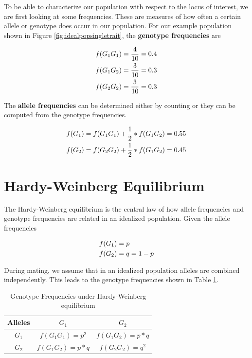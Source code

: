 \documentclass[]{book}
\theoremstyle{definition}
\theoremstyle{definition}
\theoremstyle{definition}
\theoremstyle{remark}
\begin{document}
To be able to characterize our population with respect to the locus of interest, we are first looking at some frequencies. These are measures of how often a certain allele or genotype does occur in our population. For our example population shown in Figure \ref{fig:idealpopsingletrait}, the \textbf{genotype frequencies} are

\begin{align}
f(G_1G_1) &= \frac{4}{10} = 0.4 \notag \\
f(G_1G_2) &= \frac{3}{10} = 0.3 \notag \\
f(G_2G_2) &= \frac{3}{10} = 0.3  \label{eq:genotypefreq}
\end{align}

The \textbf{allele frequencies} can be determined either by counting or they can be computed from the genotype frequencies.

\begin{align}
f(G_1) &= f(G_1G_1) + {1\over 2}*f(G_1G_2) = 0.55 \notag \\
f(G_2) &= f(G_2G_2) + {1\over 2}*f(G_1G_2) = 0.45 \label{eq:allelefreq}
\end{align}

\hypertarget{hw-eq}{%
\section{Hardy-Weinberg Equilibrium}\label{hw-eq}}

The Hardy-Weinberg equilibrium is the central law of how allele frequencies and genotype frequencies are related in an idealized population. Given the allele frequencies

\begin{align}
f(G_1) &= p \notag \\
f(G_2) &= q = 1-p
\label{eq:allelefreq}
\end{align}

During mating, we assume that in an idealized population alleles are combined independently. This leads to the genotype frequencies shown in Table \ref{tab:tabgenfreq}.

\begin{table}

\caption{\label{tab:tabgenfreq}Genotype Frequencies under Hardy-Weinberg equilibrium}
\centering
\begin{tabular}[t]{ccc}
\toprule
Alleles & $G_1$ & $G_2$\\
\midrule
$G_1$ & $f(G_1G_1) = p^2$ & $f(G_1G_2) = p*q$\\
$G_2$ & $f(G_1G_2) = p*q$ & $f(G_2G_2) = q^2$\\
\bottomrule
\end{tabular}
\end{table}
\end{document}
